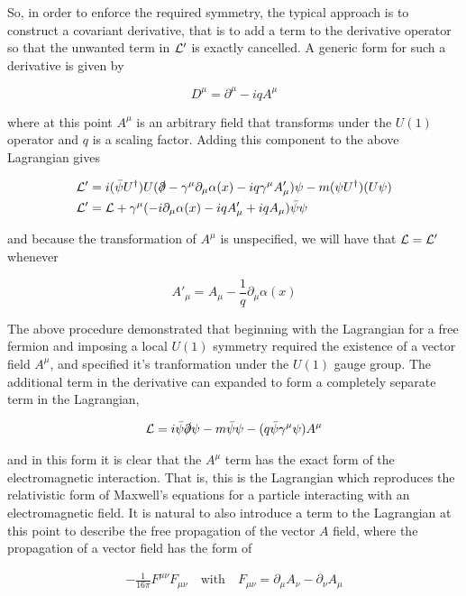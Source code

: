 \noindent So, in order to enforce the required symmetry, the typical approach is to construct a covariant derivative, that is to add a term to the derivative operator so that the unwanted term in $\mathcal{L}'$ is exactly cancelled. 
A generic form for such a derivative is given by

\[ D^\mu = \partial^{\mu} - iqA^\mu \]

\noindent where at this point $A^\mu$ is an arbitrary field that transforms under the $U(1)$ operator and $q$ is a scaling factor. Adding this component to the above Lagrangian gives

\begin{align}
 \mathcal{L}' &=  i (\bar{\psi}U^\dagger) U(\slashed{\partial} - \gamma^\mu \partial_\mu\alpha(x) - iq\gamma^\mu A'_{\mu})\psi - m(\psi U^\dagger)(U\psi) \\
 \mathcal{L}' &= \mathcal{L} +\gamma^\mu (- i\partial_\mu\alpha(x) - iqA'_{\mu} + iqA_\mu)\bar{\psi}\psi 
\end{align}

\noindent and because the transformation of $A^\mu$ is unspecified, we will have that $\mathcal{L} = \mathcal{L}'$ whenever

\[  A'_\mu =  A_{\mu} - \frac{1}{q}\partial_\mu\alpha(x) \]

The above procedure demonstrated that beginning with the Lagrangian for a free fermion and imposing a local $U(1)$ symmetry required the existence of a vector field $A^\mu$, and specified it's tranformation under the $U(1)$ gauge group.
The additional term in the derivative can expanded to form a completely separate term in the Lagrangian,

\begin{align}
\mathcal{L} = i\bar{\psi}\slashed{\partial}\psi -m\bar{\psi}\psi - (q\bar{\psi}\gamma^\mu\psi)A^\mu
\end{align}

\noindent and in this form it is clear that the $A^\mu$ term has the exact form of the electromagnetic interaction.
That is, this is the Lagrangian which reproduces the relativistic form of Maxwell's equations for a particle interacting with an electromagnetic field.
It is natural to also introduce a term to the Lagrangian at this point to describe the free propagation of the vector $A$ field, where the propagation of a vector field has the form of

\begin{align}
- \frac{1}{16\pi} F^{\mu\nu}F_{\mu\nu} \quad \mathrm{with} \quad F_{\mu\nu} = \partial_\mu A_\nu - \partial_\nu A_\mu
\end{align}

